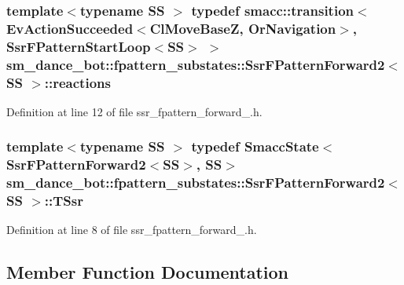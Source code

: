 \subsubsection[{\texorpdfstring{reactions}{reactions}}]{\setlength{\rightskip}{0pt plus 5cm}template$<$typename SS $>$ typedef {\bf smacc\+::transition}$<$Ev\+Action\+Succeeded$<${\bf Cl\+Move\+BaseZ}, {\bf Or\+Navigation}$>$, {\bf Ssr\+F\+Pattern\+Start\+Loop}$<$SS$>$ $>$ {\bf sm\+\_\+dance\+\_\+bot\+::fpattern\+\_\+substates\+::\+Ssr\+F\+Pattern\+Forward2}$<$ SS $>$\+::{\bf reactions}}\hypertarget{structsm__dance__bot_1_1fpattern__substates_1_1SsrFPatternForward2_a323b1557bde8fc8e8733260cec6c44bc}{}\label{structsm__dance__bot_1_1fpattern__substates_1_1SsrFPatternForward2_a323b1557bde8fc8e8733260cec6c44bc}


Definition at line 12 of file ssr\+\_\+fpattern\+\_\+forward\+\_.\+h.

\subsubsection[{\texorpdfstring{T\+Ssr}{TSsr}}]{\setlength{\rightskip}{0pt plus 5cm}template$<$typename SS $>$ typedef {\bf Smacc\+State}$<${\bf Ssr\+F\+Pattern\+Forward2}$<$SS$>$, SS$>$ {\bf sm\+\_\+dance\+\_\+bot\+::fpattern\+\_\+substates\+::\+Ssr\+F\+Pattern\+Forward2}$<$ SS $>$\+::{\bf T\+Ssr}}\hypertarget{structsm__dance__bot_1_1fpattern__substates_1_1SsrFPatternForward2_affddf34f513a44dd335f230b294397ea}{}\label{structsm__dance__bot_1_1fpattern__substates_1_1SsrFPatternForward2_affddf34f513a44dd335f230b294397ea}


Definition at line 8 of file ssr\+\_\+fpattern\+\_\+forward\+\_.\+h.



\subsection{Member Function Documentation}
